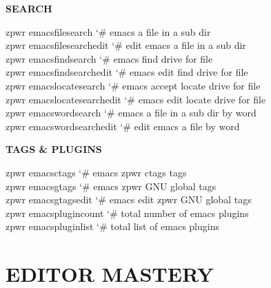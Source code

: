 \documentclass[11pt,a4paper,twoside]{book}
\begin{document}
\vspace{12pt}
{\bfseries\color{neonyellow} SEARCH}\vspace{4pt}

\begin{codebox}
\color{neongreen}zpwr emacsfilesearch       {\char`\#} emacs a file in a sub dir\\
\color{neongreen}zpwr emacsfilesearchedit   {\char`\#} edit emacs a file in a sub dir\\
\color{neongreen}zpwr emacsfindsearch       {\char`\#} emacs find drive for file\\
\color{neongreen}zpwr emacsfindsearchedit   {\char`\#} emacs edit find drive for file\\
\color{neongreen}zpwr emacslocatesearch     {\char`\#} emacs accept locate drive for file\\
\color{neongreen}zpwr emacslocatesearchedit {\char`\#} emacs edit locate drive for file\\
\color{neongreen}zpwr emacswordsearch       {\char`\#} emacs a file in a sub dir by word\\
\color{neongreen}zpwr emacswordsearchedit   {\char`\#} edit emacs a file by word\\
\end{codebox}


\vspace{12pt}
{\bfseries\color{neonyellow} TAGS \& PLUGINS}\vspace{4pt}

\begin{codebox}
\color{neongreen}zpwr emacsctags            {\char`\#} emacs zpwr ctags tags\\
\color{neongreen}zpwr emacsgtags            {\char`\#} emacs zpwr GNU global tags\\
\color{neongreen}zpwr emacsgtagsedit        {\char`\#} emacs edit zpwr GNU global tags\\
\color{neongreen}zpwr emacsplugincount      {\char`\#} total number of emacs plugins\\
\color{neongreen}zpwr emacspluginlist       {\char`\#} total list of emacs plugins\\
\end{codebox}


\vspace{16pt}


\chapter{EDITOR MASTERY}
\end{document}

